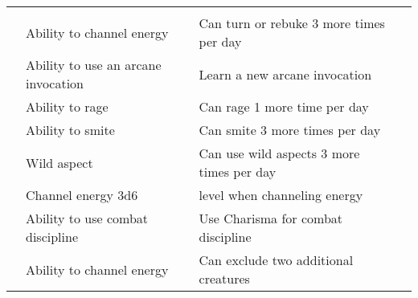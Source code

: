 {\begin{longtabu}{>{\lcol}p{15em} >{\lcol}p{15em} >{\lcol}X >{\lcol}p{10em}}
\midrule
{} &  &  \\
 & Ability to channel energy & Can turn or rebuke 3 more times per day \\
 & Ability to use an arcane invocation & Learn a new arcane invocation \\
 & Ability to rage & Can rage 1 more time per day\\
 & Ability to smite & Can smite 3 more times per day \\
 & Wild aspect & Can use wild aspects 3 more times per day \\
 & Channel energy 3d6 &  level when channeling energy \\
 & Ability to use combat discipline & Use Charisma for combat discipline \\
 & Ability to channel energy & Can exclude two additional creatures \\


\end{longtabu}}
